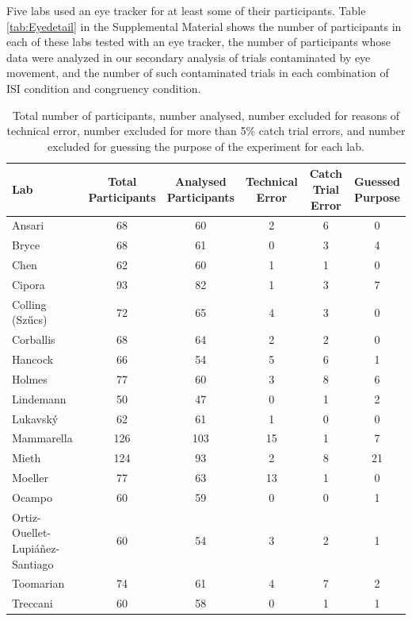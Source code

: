 \documentclass[man,floatsintext]{apa6}
\theoremstyle{definition}
\theoremstyle{definition}
\theoremstyle{definition}
\theoremstyle{remark}
\begin{document}
Five labs used an eye tracker for at least some of their participants.
Table \ref{tab:Eyedetail} in the Supplemental Material shows the number
of participants in each of these labs tested with an eye tracker, the
number of participants whose data were analyzed in our secondary
analysis of trials contaminated by eye movement, and the number of such
contaminated trials in each combination of ISI condition and congruency
condition.

\begin{table}[!h]

\caption{\label{tab:Exclusions}Total number of participants, number analysed, number excluded for reasons of technical error, number excluded for more than 5\% catch trial errors, and number excluded for guessing the purpose of the experiment for each lab.}
\centering
\begin{tabular}[t]{lccccc}
\toprule
Lab & \makecell[c]{Total\\Participants} & \makecell[c]{Analysed\\Participants} & \makecell[c]{Technical\\Error} & \makecell[c]{Catch Trial\\Error} & \makecell[c]{Guessed\\Purpose}\\
\midrule
Ansari & 68 & 60 & 2 & 6 & 0\\
Bryce & 68 & 61 & 0 & 3 & 4\\
Chen & 62 & 60 & 1 & 1 & 0\\
Cipora & 93 & 82 & 1 & 3 & 7\\
Colling (Szűcs) & 72 & 65 & 4 & 3 & 0\\
Corballis & 68 & 64 & 2 & 2 & 0\\
Hancock & 66 & 54 & 5 & 6 & 1\\
Holmes & 77 & 60 & 3 & 8 & 6\\
Lindemann & 50 & 47 & 0 & 1 & 2\\
Lukavský & 62 & 61 & 1 & 0 & 0\\
Mammarella & 126 & 103 & 15 & 1 & 7\\
Mieth & 124 & 93 & 2 & 8 & 21\\
Moeller & 77 & 63 & 13 & 1 & 0\\
Ocampo & 60 & 59 & 0 & 0 & 1\\
Ortiz-Ouellet-Lupiáñez-Santiago & 60 & 54 & 3 & 2 & 1\\
Toomarian & 74 & 61 & 4 & 7 & 2\\
Treccani & 60 & 58 & 0 & 1 & 1\\
\bottomrule
\end{tabular}
\end{table}
\end{document}
